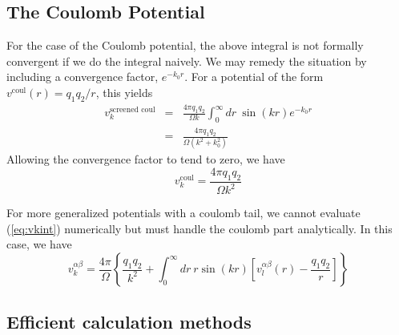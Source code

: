 \subsection{The Coulomb Potential}
For the case of the Coulomb potential, the above integral is not
formally convergent if we do the integral naively. We may remedy the
situation by including a convergence factor, $e^{-k_0 r}$.  For a
potential of the form $v^{\text{coul}}(r) = q_1 q_2/r$, this yields
\begin{eqnarray}
v^{\text{screened coul}}_k & = & \frac{4\pi q_1 q_2}{\Omega k} \int_0^\infty dr\ \sin(kr)
e^{-k_0r} \\ 
& = & \frac{4\pi q_1 q_2}{\Omega (k^2 + k_0^2)}
\end{eqnarray}
Allowing the convergence factor to tend to zero, we have
\begin{equation}
v_k^\text{coul} = \frac{4 \pi q_1 q_2}{\Omega k^2}
\end{equation}

For more generalized potentials with a coulomb tail, we cannot
evaluate (\ref{eq:vkint}) numerically but must handle the coulomb part
analytically.  In this case, we have
\begin{equation}
v_k^{\alpha \beta} = \frac{4\pi}{\Omega} 
\left\{ \frac{q_1 q_2}{k^2} + \int_0^\infty dr \ r \sin(kr) \left[ v_l^{\alpha \beta}(r) -
  \frac{q_1 q_2}{r} \right] \right\}
\end{equation}

\subsection{Efficient calculation methods}
